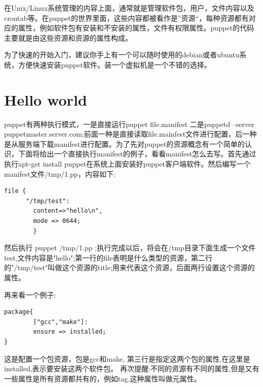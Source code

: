 \par
在Unix/Linux系统管理的内容上面，通常就是管理软件包，用户，文件内容以及crontab等。在puppet的世界里面，这些内容都被看作是”资源“，每种资源都有对应的属性，例如软件包有安装和不安装的属性，文件有权限属性。puppet的代码主要就是由这些资源和资源的属性构成。
\par
为了快速的开始入门，建议你手上有一个可以随时使用的debian或者ubuntu系统，方便快速安装puppet软件。装一个虚拟机是一个不错的选择。\par

\section{\msyh Hello world}
puppet有两种执行模式，一是直接运行puppet file.manifest 二是puppetd --server puppetmaster.server.com;前面一种是直接读取file.mainfest文件进行配置，后一种是从服务端下载manifest进行配置。为了先对puppet的资源概念有一个简单的认识，下面将给出一个直接执行manifest的例子，看看manifest怎么去写。首先通过执行apt-get install puppet在系统上面安装好puppet客户端软件。然后编写一个manifest文件/tmp/1.pp，内容如下:
\msyh\small
\begin{lstlisting}
file {
      "/tmp/test":
        content=>"hello\n",
        mode => 0644;
        }
\end{lstlisting}
\song
然后执行 puppet  /tmp/1.pp ;执行完成以后，将会在/tmp目录下面生成一个文件test,文件内容是"hello";第一行的file表明是什么类型的资源，第二行的"/tmp/test"叫做这个资源的title;用来代表这个资源，后面两行设置这个资源的属性。\par
再来看一个例子:
\msyh
\begin{lstlisting}
package{
        ["gcc","make"]:
        ensure => installed;
}
\end{lstlisting}
\song
这是配置一个包资源，包是gcc和make, 第三行是指定这两个包的属性,在这里是installed,表示要安装这两个软件包。
\msyh 再次提醒:不同的资源有不同的属性,但是又有一些属性是所有资源都共有的，例如tag,这种属性叫做元属性。
\song
\newpage


